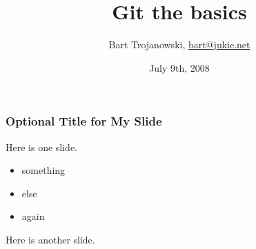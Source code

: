 \documentclass[english]{beamer}
\title{Git the basics}
\author{Bart Trojanowski, \href{mailto:bart@jukie.net}{bart@jukie.net}}
\institute{Jukie Networks Inc.}
\date{July 9th, 2008}
\begin{document}
\label{header}\hypertarget{header}{}
\frame{\maketitle}

\begin{frame}
\frametitle{Optional Title for My Slide}
Here is one slide.

\begin{itemize}
        \item something
                \pause
        \item else
                \pause
        \item again
\end{itemize}

\end{frame}

\begin{frame}
Here is another slide.
\end{frame}

\end{document}

